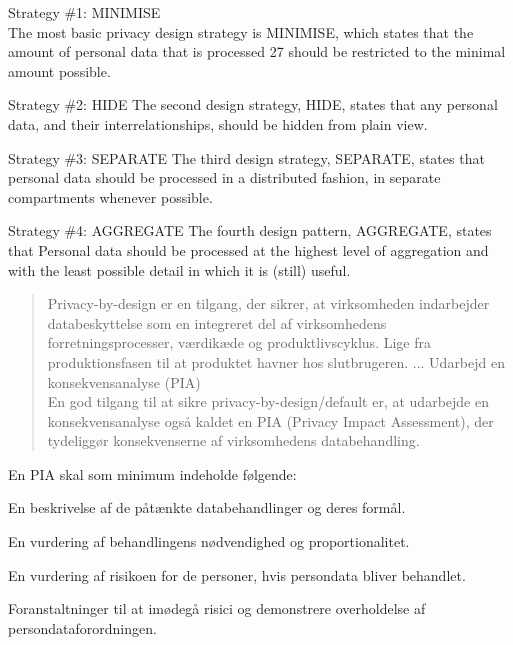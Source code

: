 \documentclass[Screen16to9,17pt]{foils}
\begin{document}
\begin{list2}
\item Strategy \#1: MINIMISE\\
The most basic privacy design strategy is MINIMISE, which states that the amount of personal data
that is processed 27 should be restricted to the minimal amount possible.
\item Strategy \#2: HIDE
The second design strategy, HIDE, states that any personal data, and their interrelationships, should
be hidden from plain view.
\item Strategy \#3: SEPARATE
The third design strategy, SEPARATE, states that personal data should be processed in a distributed
fashion, in separate compartments whenever possible.
\item Strategy \#4: AGGREGATE
The fourth design pattern, AGGREGATE, states that Personal data should be processed at the highest
level of aggregation and with the least possible detail in which it is (still) useful.
\end{list2}




\begin{quote}\small
Privacy-by-design er en tilgang, der sikrer, at virksomheden indarbejder databeskyttelse som en integreret del af virksomhedens forretningsprocesser, værdikæde og produktlivscyklus. Lige fra produktionsfasen til at produktet havner hos slutbrugeren.
...
Udarbejd en konsekvensanalyse (PIA)\\
En god tilgang til at sikre privacy-by-design/default er, at udarbejde en konsekvensanalyse også kaldet en PIA (Privacy Impact Assessment), der tydeliggør konsekvenserne af virksomhedens databehandling.
\end{quote}

En PIA skal som minimum indeholde følgende:

\begin{list2}
\item En beskrivelse af de påtænkte databehandlinger og deres formål.
\item En vurdering af behandlingens nødvendighed og proportionalitet.
\item En vurdering af risikoen for de personer, hvis persondata bliver behandlet.
\item Foranstaltninger til at imødegå risici og demonstrere overholdelse af persondataforordningen.
\end{list2}
\end{document}
